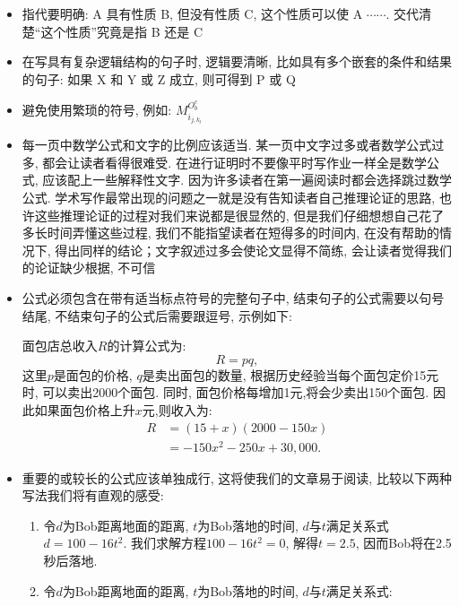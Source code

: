 \documentclass{formatBook}
\begin{document}
\begin{itemize}
    \item 指代要明确: A 具有性质 B, 但没有性质 C, 这个性质可以使 A $\cdots\cdots$. 交代清楚“这个性质”究竟是指 B 还是 C
    \item 在写具有复杂逻辑结构的句子时, 逻辑要清晰, 比如具有多个嵌套的条件和结果的句子: 如果 X 和 Y 或 Z 成立, 则可得到 P 或 Q
    \item 避免使用繁琐的符号, 例如: $M_{i_{j, k_{t}}}^{O_{b}^{c}}$
    \item 每一页中数学公式和文字的比例应该适当. 某一页中文字过多或者数学公式过多, 都会让读者看得很难受. 在进行证明时不要像平时写作业一样全是数学公式, 应该配上一些解释性文字. 因为许多读者在第一遍阅读时都会选择跳过数学公式. 学术写作最常出现的问题之一就是没有告知读者自己推理论证的思路, 也许这些推理论证的过程对我们来说都是很显然的, 但是我们仔细想想自己花了多长时间弄懂这些过程, 我们不能指望读者在短得多的时间内, 在没有帮助的情况下, 得出同样的结论；文字叙述过多会使论文显得不简练, 会让读者觉得我们的论证缺少根据, 不可信
    \item 公式必须包含在带有适当标点符号的完整句子中, 结束句子的公式需要以句号结尾, 不结束句子的公式后需要跟逗号, 示例如下: \par
          面包店总收入$R$的计算公式为: 
          \begin{equation*}
              R=pq,
          \end{equation*}
          这里$p$是面包的价格, $q$是卖出面包的数量, 根据历史经验当每个面包定价15元时, 可以卖出2000个面包. 同时, 面包价格每增加1元,将会少卖出150个面包. 因此如果面包价格上升$x$元,则收入为: 
          \begin{equation*}
              \begin{split}
                  R&=(15+x)(2000-150x)\\
                  &=-150x^{2}-250x+30,000.
              \end{split}
          \end{equation*}
    \item 重要的或较长的公式应该单独成行, 这将使我们的文章易于阅读, 比较以下两种写法我们将有直观的感受: 
          \begin{enumerate}
              \item 令$d$为Bob距离地面的距离, $t$为Bob落地的时间, $d$与$t$满足关系式$d = 100 − 16t^{2}$. 我们求解方程$100 − 16t^{2} = 0$, 解得$t =2.5$, 因而Bob将在2.5秒后落地. 
              \item 令$d$为Bob距离地面的距离, $t$为Bob落地的时间, $d$与$t$满足关系式: 
                    \begin{equation*}

\end{equation*}
\end{enumerate}
\end{itemize}
\end{document}
